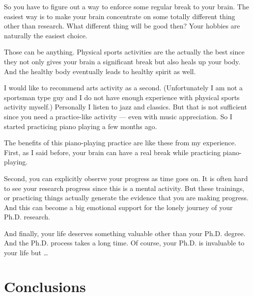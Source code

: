 \documentclass[11pt]{article}
\begin{document}
So you have to figure out a way to enforce some regular break to your
brain. The easiest way is to make your brain concentrate on some totally
different thing other than research. What different thing will be good then?
Your hobbies are naturally the easiest choice. 

Those can be anything. Physical sports activities are the actually the
best since they not only gives your brain a significant break but also
heals up your body. And the healthy body eventually leads to healthy
spirit as well. 

I would like to recommend arts activity as a second. (Unfortunately I am
not a sportsman type guy and I do not have enough experience with
physical sports activity myself.) Personally I listen to jazz and
classics. But that is not sufficient since you need a practice-like
activity --- even with music appreciation. So I started practicing piano
playing a few months ago. 

The benefits of this piano-playing practice are like these from my
experience. First, as I said before, your brain can have a real break
while practicing piano-playing.

Second, you can explicitly observe your progress as time goes
on. It is often hard to see your research progress since this is a
mental activity. But these trainings, or practicing things actually
generate the evidence that you are making progress. And this can become
a big emotional support for the lonely journey of your Ph.D. research.

And finally, your life deserves something valuable other than your Ph.D.
degree. And the Ph.D. process takes a long time. Of course, your Ph.D.
is invaluable to your life but \ldots


\section{Conclusions}
\end{document}
